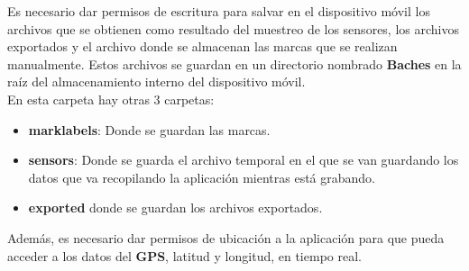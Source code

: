 	\indent Es necesario dar permisos de escritura para salvar en el dispositivo móvil los archivos que se obtienen como resultado del 
	muestreo de los sensores, los archivos exportados y el archivo donde se almacenan las marcas que se realizan manualmente. Estos archivos
	se guardan en un directorio nombrado \textbf{Baches} en la raíz del almacenamiento interno del dispositivo móvil.\\
	\indent En esta carpeta hay otras 3 carpetas:

	\begin{itemize}
		\item \textbf{mark\textunderscore labels}: Donde se guardan las marcas.
		\item \textbf{sensors}: Donde se guarda el archivo temporal en el que se van guardando los datos que va recopilando la aplicación
			mientras está grabando.
		\item \textbf{exported} donde se guardan los archivos exportados.
	\end{itemize}

	Además, es necesario dar permisos de ubicación a la aplicación para que pueda acceder a los datos del \textbf{GPS}, latitud y longitud,
	en tiempo real.


